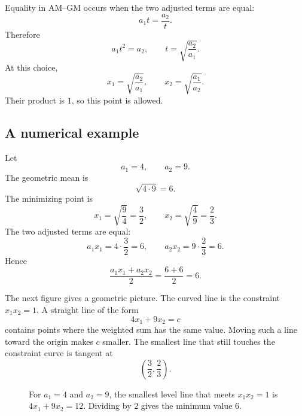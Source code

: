\documentclass[11pt]{article}
\begin{document}
Equality in AM--GM occurs when the two adjusted terms are equal:
\[
 a_1t=\frac{a_2}{t}.
\]
Therefore
\[
 a_1t^2=a_2,
 \qquad
 t=\sqrt{\frac{a_2}{a_1}}.
\]
At this choice,
\[
 x_1=\sqrt{\frac{a_2}{a_1}},
 \qquad
 x_2=\sqrt{\frac{a_1}{a_2}}.
\]
Their product is $1$, so this point is allowed.

\subsection{A numerical example}

Let
\[
 a_1=4,
 \qquad
 a_2=9.
\]
The geometric mean is
\[
 \sqrt{4\cdot9}=6.
\]
The minimizing point is
\[
 x_1=\sqrt{\frac94}=\frac32,
 \qquad
 x_2=\sqrt{\frac49}=\frac23.
\]
The two adjusted terms are equal:
\[
 a_1x_1=4\cdot\frac32=6,
 \qquad
 a_2x_2=9\cdot\frac23=6.
\]
Hence
\[
 \frac{a_1x_1+a_2x_2}{2}
 =\frac{6+6}{2}=6.
\]

The next figure gives a geometric picture.  The curved line is the constraint
$x_1x_2=1$.  A straight line of the form
\[
 4x_1+9x_2=c
\]
contains points where the weighted sum has the same value.  Moving such a line
toward the origin makes $c$ smaller.  The smallest line that still touches the
constraint curve is tangent at
\[
 \left(\frac32,\frac23\right).
\]

\begin{figure}[htbp]
\centering
{}
\caption{For $a_1=4$ and $a_2=9$, the smallest level line that meets
$x_1x_2=1$ is $4x_1+9x_2=12$.  Dividing by $2$ gives the minimum value $6$.}
\end{figure}
\end{document}

